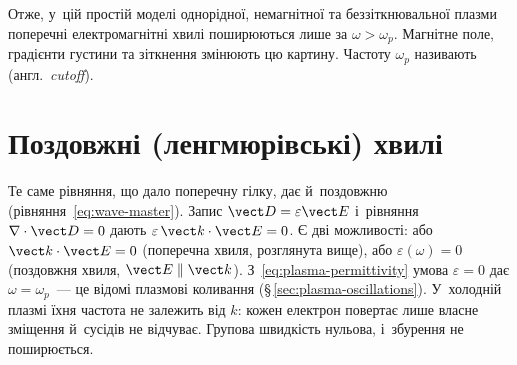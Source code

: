 Отже, у~цій простій моделі однорідної, немагнітної та беззіткнювальної плазми поперечні
електромагнітні хвилі поширюються лише за $\omega>\omega_p$. Магнітне поле, градієнти
густини та зіткнення змінюють цю картину. Частоту $\omega_p$ називають  (англ.~\emph{cutoff}).

\section{Поздовжні (ленгмюрівські) хвилі}\label{sec:langmuir-waves}

Те саме рівняння, що дало поперечну гілку, дає й~поздовжню (рівняння~\eqref{eq:wave-master}). Запис $\vect D=\varepsilon\vect E$ і~рівняння $\nabla\cdot\vect D=0$ дають
$\varepsilon\,\vect k\cdot\vect E=0$. Є дві можливості: або $\vect k\cdot\vect E=0$
(поперечна хвиля, розглянута вище), або $\varepsilon(\omega)=0$ (поздовжня хвиля, $\vect
E\parallel\vect k$). З~\eqref{eq:plasma-permittivity} умова $\varepsilon=0$ дає
$\omega=\omega_p$~--- це відомі плазмові коливання (§\,\ref{sec:plasma-oscillations}).
У~холодній плазмі їхня частота не залежить від $k$: кожен електрон повертає лише власне
зміщення й~сусідів не відчуває. Групова швидкість нульова, і~збурення не поширюється.

